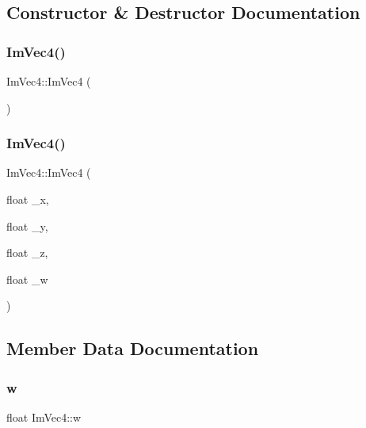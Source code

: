 \subsection{Constructor \& Destructor Documentation}
\mbox{\label{struct_im_vec4_a6fba9919c960ca7eda33969d700d2a86}} 
\subsubsection{\texorpdfstring{Im\+Vec4()}{ImVec4()}\hspace{0.1cm}{\footnotesize\ttfamily [1/2]}}
{\footnotesize\ttfamily Im\+Vec4\+::\+Im\+Vec4 (\begin{DoxyParamCaption}{ }\end{DoxyParamCaption})\hspace{0.3cm}{\ttfamily [inline]}}

\mbox{\label{struct_im_vec4_af9e535f36b0fc7b9af0f60951fb4ffe4}} 
\subsubsection{\texorpdfstring{Im\+Vec4()}{ImVec4()}\hspace{0.1cm}{\footnotesize\ttfamily [2/2]}}
{\footnotesize\ttfamily Im\+Vec4\+::\+Im\+Vec4 (\begin{DoxyParamCaption}\item[{float}]{\+\_\+x,  }\item[{float}]{\+\_\+y,  }\item[{float}]{\+\_\+z,  }\item[{float}]{\+\_\+w }\end{DoxyParamCaption})\hspace{0.3cm}{\ttfamily [inline]}}



\subsection{Member Data Documentation}
\mbox{\label{struct_im_vec4_afeed5acd9f0d2043175f4da229d12a38}} 
\subsubsection{\texorpdfstring{w}{w}}
{\footnotesize\ttfamily float Im\+Vec4\+::w}

